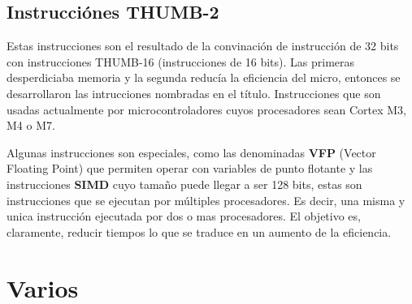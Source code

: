 \documentclass[a4paper,12pt]{report} %
\begin{document}
\section{Instrucciónes THUMB-2}

Estas instrucciones son el resultado de la convinación de instrucción de 32 bits con instrucciones THUMB-16 (instrucciones de 16 bits). Las primeras desperdiciaba memoria y la segunda reducía la eficiencia del micro, entonces se desarrollaron las intrucciones nombradas en el título. Instrucciones que son usadas actualmente por microcontroladores cuyos procesadores sean Cortex M3, M4 o M7.

Algunas instrucciones son especiales, como las denominadas \textbf{VFP} (Vector Floating Point) que permiten operar con variables de punto flotante y las instrucciones \textbf{SIMD} cuyo tamaño puede llegar a ser 128 bits, estas son instrucciones que se ejecutan por múltiples procesadores. Es decir, una misma y unica instrucción ejecutada por dos o mas procesadores. El objetivo es, claramente, reducir tiempos lo que se traduce en un aumento de la eficiencia.







\chapter*{Varios}
\end{document}
